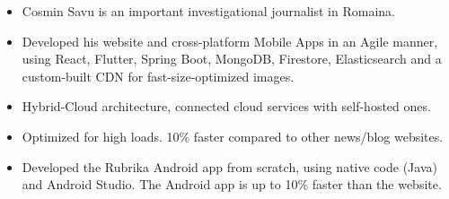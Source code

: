 \documentclass[10pt,a4paper,ragged2e]{resume}
\begin{document}

    \begin{fullwidth}
        \makecvheader
    \end{fullwidth}





    \begin{itemize}
        \item Cosmin Savu is an important investigational journalist in Romaina.
        \item Developed his website and cross-platform Mobile Apps in an Agile manner, using React, Flutter, Spring Boot, MongoDB, Firestore, Elasticsearch and a custom-built CDN for fast-size-optimized images.
        \item Hybrid-Cloud architecture, connected cloud services with self-hosted ones.
        \item Optimized for high loads.
        10\% faster compared to other news/blog websites.
    \end{itemize}

    \divider

    \begin{itemize}
        \item Developed the Rubrika Android app from scratch, using native code (Java) and Android Studio.
        The Android app is up to 10\% faster than the website.
        \smallskip
    \end{itemize}
\end{document}
